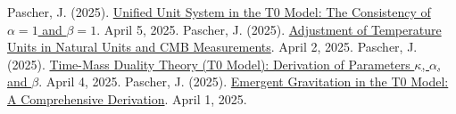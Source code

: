 \documentclass[a4paper,12pt]{article}
\begin{document}
\begin{thebibliography}{99}
		 Pascher, J. (2025). \href{https://github.com/jpascher/T0-Time-Mass-Duality/tree/main/2/pdf/English/Alpha1Beta1KonsistenzEn.pdf}{Unified Unit System in the T0 Model: The Consistency of \(\alpha = 1\) and \(\beta = 1\)}. April 5, 2025.
		 Pascher, J. (2025). \href{https://github.com/jpascher/T0-Time-Mass-Duality/tree/main/2/pdf/English/NatEinheitenAlpha1En.pdf}{Adjustment of Temperature Units in Natural Units and CMB Measurements}. April 2, 2025.
		 Pascher, J. (2025). \href{https://github.com/jpascher/T0-Time-Mass-Duality/tree/main/2/pdf/English/ZeitMasseT0ParamsEn.pdf}{Time-Mass Duality Theory (T0 Model): Derivation of Parameters \(\kappa\), \(\alpha\), and \(\beta\)}. April 4, 2025.
		 Pascher, J. (2025). \href{https://github.com/jpascher/T0-Time-Mass-Duality/tree/main/2/pdf/English/EmergentGravT0En.pdf}{Emergent Gravitation in the T0 Model: A Comprehensive Derivation}. April 1, 2025.
	\end{thebibliography}
	
\end{document}
